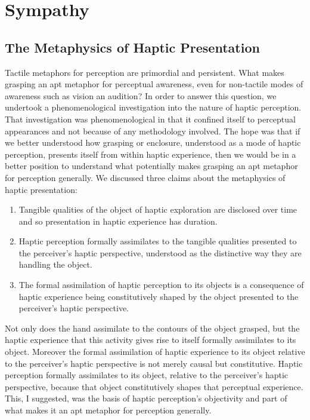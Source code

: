 \chapter{Sympathy} %
\label{cha:sympathy}


\section{The Metaphysics of Haptic Presentation} %
\label{sec:the_metaphysics_of_haptic_presentation}

Tactile metaphors for perception are primordial and persistent. What makes grasping an apt metaphor for perceptual awareness, even for non-tactile modes of awareness such as vision an audition? In order to answer this question, we undertook a phenomenological investigation into the nature of haptic perception. That investigation was phenomenological in that it confined itself to perceptual appearances and not because of any methodology involved. The hope was that if we better understood how grasping or enclosure, understood as a mode of haptic perception, presents itself from within haptic experience, then we would be in a better position to understand what potentially makes grasping an apt metaphor for perception generally. We discussed three claims about the metaphysics of haptic presentation:
\begin{enumerate}[(1)]
	\item Tangible qualities of the object of haptic exploration are disclosed over time and so presentation in haptic experience has duration.
	\item Haptic perception formally assimilates to the tangible qualities presented to the perceiver's haptic perspective, understood as the distinctive way they are handling the object.
	\item The formal assimilation of haptic perception to its objects is a consequence of haptic experience being constitutively shaped by the object presented to the perceiver's haptic perspective.
\end{enumerate}
Not only does the hand assimilate to the contours of the object grasped, but the haptic experience that this activity gives rise to itself formally assimilates to its object. Moreover the formal assimilation of haptic experience to its object relative to the perceiver's haptic perspective is not merely causal but constitutive. Haptic perception formally assimilates to its object, relative to the perceiver's haptic perspective, because that object constitutively shapes that perceptual experience. This, I suggested, was the basis of haptic perception's objectivity and part of what makes it an apt metaphor for perception generally. 

